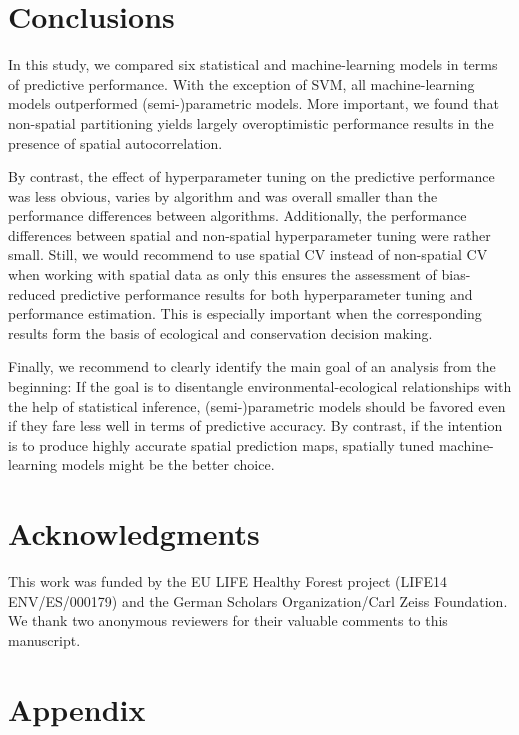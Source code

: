 \documentclass[review]{elsarticle}
\begin{document}
\section{Conclusions}

\noindent In this study, we compared six statistical and machine-learning models in terms of predictive performance.
With the exception of SVM, all machine-learning models outperformed (semi-)parametric models.
More important, we found that non-spatial partitioning yields largely overoptimistic performance results in the presence of spatial autocorrelation.

By contrast, the effect of hyperparameter tuning on the predictive performance was less obvious, varies by algorithm and was overall smaller than the performance differences between algorithms.
Additionally, the performance differences between spatial and non-spatial hyperparameter tuning were rather small.
Still, we would recommend to use spatial \ac{CV} instead of non-spatial \ac{CV} when working with spatial data as only this ensures the assessment of bias-reduced predictive performance results for both hyperparameter tuning and performance estimation.
This is especially important when the corresponding results form the basis of ecological and conservation decision making.

Finally, we recommend to clearly identify the main goal of an analysis from the beginning:
If the goal is to disentangle environmental-ecological relationships with the help of statistical inference, (semi-)parametric models should be favored even if they fare less well in terms of predictive accuracy.
By contrast, if the intention is to produce highly accurate spatial prediction maps, spatially tuned machine-learning models might be the better choice.

\section{Acknowledgments}
This work was funded by the EU LIFE Healthy Forest project (LIFE14 ENV/ES/000179) and the German Scholars Organization/Carl Zeiss Foundation.
We thank two anonymous reviewers for their valuable comments to this manuscript.

\section{Appendix}
\end{document}

